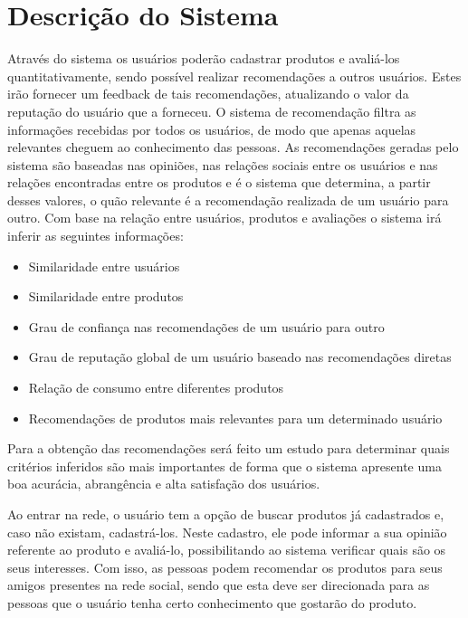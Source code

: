 
\section{Descrição do Sistema}


 Através do sistema os usuários poderão cadastrar produtos e avaliá-los quantitativamente, sendo possível realizar recomendações a outros usuários. Estes irão fornecer um feedback de tais recomendações, atualizando o valor da reputação do usuário que a forneceu. O sistema de recomendação filtra as informações recebidas por todos os usuários, de modo que apenas aquelas relevantes cheguem ao conhecimento das pessoas. As recomendações geradas pelo sistema são baseadas nas opiniões, nas relações sociais entre os usuários e nas relações encontradas entre os produtos e é o sistema que determina, a partir desses valores, o quão relevante é a recomendação realizada de um usuário para outro. Com base na relação entre usuários, produtos e avaliações o sistema irá inferir as seguintes informações:
 
\begin{itemize}

 \item Similaridade entre usuários

 \item Similaridade entre produtos

 \item Grau de confiança nas recomendações de um usuário para outro

 \item Grau de reputação global de um usuário baseado nas recomendações diretas

 \item Relação de consumo entre diferentes produtos

 \item Recomendações de produtos mais relevantes para um determinado usuário

\end{itemize}

 Para a obtenção das recomendações será feito um estudo para determinar quais critérios inferidos são mais importantes de forma que o sistema apresente uma boa acurácia, abrangência e alta satisfação dos usuários.


 Ao entrar na rede, o usuário tem a opção de buscar produtos já cadastrados e, caso não existam, cadastrá-los. Neste cadastro, ele pode informar a sua opinião referente ao produto e avaliá-lo, possibilitando ao sistema verificar quais são os seus interesses. Com isso, as pessoas podem recomendar os produtos para seus amigos presentes na rede social, sendo que esta deve ser direcionada para as pessoas que o usuário tenha certo conhecimento que gostarão do produto.

